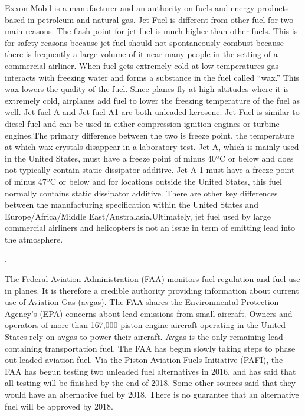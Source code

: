 \documentclass{article}
\begin{document}
Exxon Mobil is a manufacturer and an authority on fuels and energy products based in petroleum and natural gas. Jet Fuel is different from other fuel for two main reasons. The flash-point for jet fuel is much higher than other fuels. This is for safety reasons because jet fuel should not spontaneously combust because there is frequently a large volume of it near many people in the setting of a commercial airliner. When fuel gets extremely cold at low temperatures gas interacts with freezing water and forms a substance in the fuel called “wax.” This wax lowers the quality of the fuel. Since planes fly at high altitudes where it is extremely cold, airplanes add fuel to lower the freezing temperature of the fuel as well. Jet fuel A and Jet fuel A1 are both unleaded kerosene. Jet Fuel is similar to diesel fuel and can be used in either compression ignition engines or turbine engines.The primary difference between the two is freeze point, the temperature at which wax crystals disappear in a laboratory test. Jet A, which is mainly used in the United States, must have a freeze point of minus 40ºC or below and does not typically contain static dissipator additive. Jet A-1 must have a freeze point of minus 47ºC or below and for locations outside the United States, this fuel normally contains static dissipator additive. There are other key differences between the manufacturing specification within the United States and Europe/Africa/Middle East/Australasia.Ultimately, jet fuel used by large commercial airliners and helicopters  is not an issue in term of emitting lead into the atmosphere.

\bigskip

\noindent {} .

The Federal Aviation Administration (FAA) monitors fuel regulation and fuel use in planes. It is therefore a credible authority providing information about current use of Aviation Gas (avgas). The FAA shares the Environmental Protection Agency's (EPA) concerns about lead emissions from small aircraft. Owners and operators of more than 167,000 piston-engine aircraft operating in the United States rely on avgas to power their aircraft. Avgas is the only remaining lead-containing transportation fuel. The FAA has begun slowly taking steps to phase out leaded aviation fuel. Via the Piston Aviation Fuels Initiative (PAFI), the FAA has begun testing two unleaded fuel alternatives in 2016, and has said that all testing will be finished by the end of 2018. Some other sources said that they would have an alternative fuel by 2018. There is no guarantee that an alternative fuel will be approved by 2018. 
\end{document}
